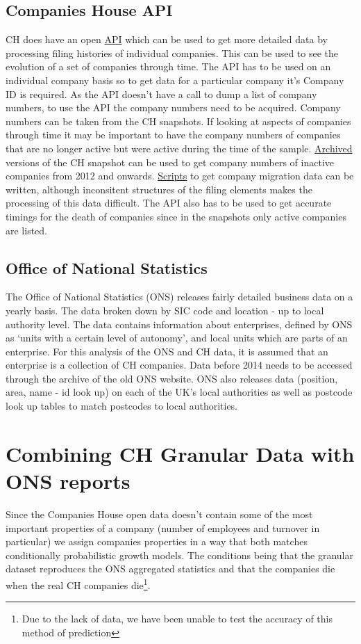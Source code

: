 \documentclass[a4paper,10pt]{article}
\begin{document}
\subsection{Companies House API}
CH does have an open \href{https://developer.companieshouse.gov.uk/api/docs/}{API} which can be used to get more detailed data by processing filing histories of individual companies. This can be used to see the evolution of a set of companies through time. The API has to be used on an individual company basis so to get data for a particular company it's Company ID is required. As the API doesn't have a call to dump a list of company numbers, to use the API the company numbers need to be acquired. Company numbers can be taken from the CH snapshots. If looking at aspects of companies through time it may be important to have the company numbers of companies that are no longer active but were active during the time of the sample. \href{https://web.archive.org/web/*/http://download.companieshouse.gov.uk/en_output.html}{Archived} versions of the CH snapshot can be used to get company numbers of inactive companies from 2012 and onwards. \href{https://github.com/alfredholmes/abm_job_locations/tree/master/Data%20Analysis/CH%20API%20Company%20migrations}{Scripts} to get company migration data can be written, although inconsitent structures of the filing elements makes the processing of this data difficult. The API also has to be used to get accurate timings for the death of companies since in the snapshots only active companies are listed.
\subsection{Office of National Statistics}
The Office of National Statistics (ONS) releases fairly detailed business data on a yearly basis. The data broken down by SIC code and location - up to local authority level. The data contains information about enterprises, defined by ONS as `units with a certain level of autonomy', and local units which are parts of an enterprise. For this analysis of the ONS and CH data, it is assumed that an enterprise is a collection of CH companies. Data before 2014 needs to be accessed through the archive of the old ONS website. ONS also releases data (position, area, name - id look up) on each of the UK's local authorities as well as postcode look up tables to match postcodes to local authorities.

\section{Combining CH Granular Data with ONS reports}
Since the Companies House open data doesn't contain some of the most important properties of a company (number of employees and turnover in particular) we assign companies properties in a way that both matches conditionally probabilistic growth models. The conditions being that the granular dataset reproduces the ONS aggregated statistics and that the companies die when the real CH companies die\footnote{Due to the lack of data, we have been unable to test the accuracy of this method of prediction}.
\end{document}
